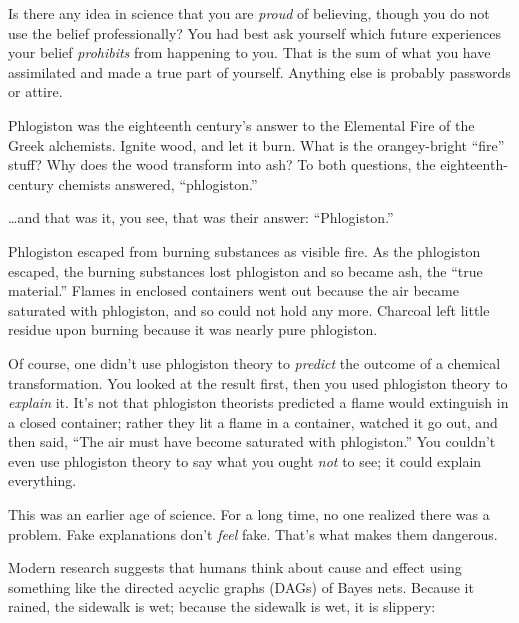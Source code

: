 {
 Is there any idea in science that you are \textit{proud} of
believing, though you do not use the belief professionally? You had
best ask yourself which future experiences your belief
\textit{prohibits} from happening to you. That is the sum of what you
have assimilated and made a true part of yourself. Anything else is
probably passwords or attire.}

\myendsectiontext


{
 Phlogiston was the eighteenth century's answer to
the Elemental Fire of the Greek alchemists. Ignite wood, and let it
burn. What is the orangey-bright
``fire'' stuff? Why does the wood
transform into ash? To both questions, the eighteenth-century chemists
answered, ``phlogiston.'' }

{
 \ldots and that was it, you see, that was their answer:
``Phlogiston.''}

{
 Phlogiston escaped from burning substances as visible fire. As the
phlogiston escaped, the burning substances lost phlogiston and so
became ash, the ``true material.''
Flames in enclosed containers went out because the air became saturated
with phlogiston, and so could not hold any more. Charcoal left little
residue upon burning because it was nearly pure phlogiston.}

{
 Of course, one didn't use phlogiston theory to
\textit{predict} the outcome of a chemical transformation. You looked
at the result first, then you used phlogiston theory to
\textit{explain} it. It's not that phlogiston theorists
predicted a flame would extinguish in a closed container; rather they
lit a flame in a container, watched it go out, and then said,
``The air must have become saturated with
phlogiston.'' You couldn't even use
phlogiston theory to say what you ought \textit{not} to see; it could
explain everything.}

{
 This was an earlier age of science. For a long time, no one
realized there was a problem. Fake explanations don't
\textit{feel} fake. That's what makes them dangerous.}

{
 Modern research suggests that humans think about cause and effect
using something like the directed acyclic graphs (DAGs) of Bayes nets.
Because it rained, the sidewalk is wet; because the sidewalk is wet, it
is slippery:}

{
 ~}


{
 ~}


